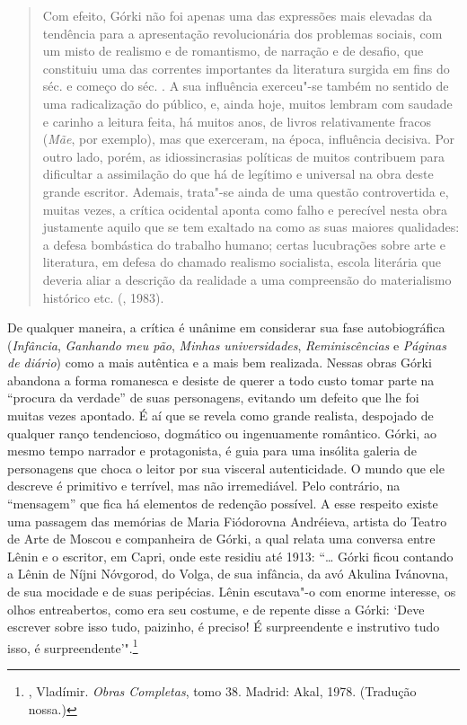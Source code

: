 \begin{quotation}
Com efeito, Górki não foi apenas uma das expressões mais elevadas
da tendência para a apresentação revolucionária dos problemas
sociais, com um misto de realismo e de romantismo, de narração e
de desafio, que constituiu uma das correntes importantes da
literatura surgida em fins do séc.  e começo do séc.
. A sua influência exerceu"-se também no sentido de
uma radicalização do público, e, ainda hoje, muitos lembram com
saudade e carinho a leitura feita, há muitos anos, de livros
relativamente fracos (\emph{Mãe}, por exemplo), mas que exerceram,
na época, influência decisiva. Por outro lado, porém, as
idiossincrasias políticas de muitos contribuem para dificultar a
assimilação do que há de legítimo e universal na obra deste grande
escritor. Ademais, trata"-se ainda de uma questão controvertida e,
muitas vezes, a crítica ocidental aponta como falho e perecível
nesta obra justamente aquilo que se tem exaltado na 
como as suas maiores qualidades: a defesa bombástica do trabalho
humano; certas lucubrações sobre arte e literatura, em defesa do
chamado realismo socialista, escola literária que deveria aliar a
descrição da realidade a uma compreensão do materialismo histórico etc. (, 1983).
\end{quotation}

De qualquer maneira, a crítica é unânime em considerar sua fase
autobiográfica (\emph{Infância}, \emph{Ganhando meu pão},
\emph{Minhas universidades}, \emph{Reminiscências} e \emph{Páginas
de diário}) como a mais autêntica e a mais bem realizada. Nessas
obras Górki abandona a forma romanesca e desiste de querer a todo
custo tomar parte na ``procura da verdade'' de suas personagens,
evitando um defeito que lhe foi muitas vezes apontado. É aí que
se revela como grande realista, despojado de qualquer ranço
tendencioso, dogmático ou ingenuamente romântico. Górki, ao mesmo
tempo narrador e protagonista, é guia para uma insólita galeria
de personagens que choca o leitor por sua visceral autenticidade.
O mundo que ele descreve é primitivo e terrível, mas não
irremediável. Pelo contrário, na ``mensagem'' que fica há
elementos de redenção possível. A esse respeito existe uma
passagem das memórias de Maria Fiódorovna Andréieva, artista do
Teatro de Arte de Moscou e companheira de Górki, a qual relata
uma conversa entre Lênin e o escritor, em Capri, onde este
residiu até 1913: ``\ldots{} Górki ficou contando a Lênin de
Níjni Nóvgorod, do Volga, de sua infância, da avó Akulina
Ivánovna, de sua mocidade e de suas peripécias. Lênin escutava"-o
com enorme interesse, os olhos entreabertos, como era seu costume,
e de repente disse a Górki: `Deve escrever sobre isso tudo,
paizinho, é preciso! É surpreendente e instrutivo tudo isso, é
surpreendente'".\footnote{, Vladímir. \emph{Obras
Completas}, tomo 38. Madrid: Akal, 1978. (Tradução nossa.)}

